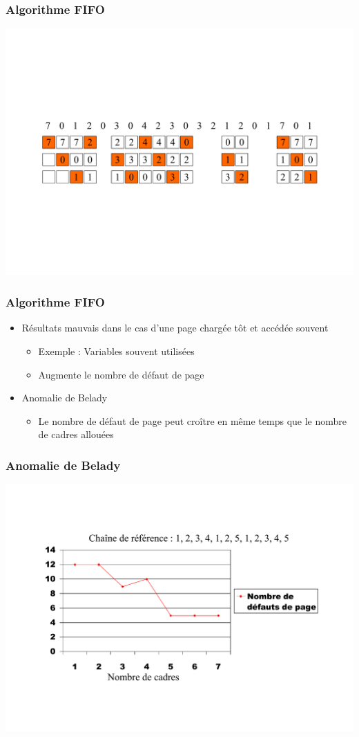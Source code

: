\begin{frame}
\frametitle{Algorithme FIFO}
\includegraphics[width=\textwidth]{../illustration/remplacement_fifo.pdf}
\end{frame}


\begin{frame}
\frametitle{Algorithme FIFO}
\begin{itemize}
\item Résultats mauvais dans le cas d'une page chargée tôt et accédée souvent
\begin{itemize}
\item Exemple : Variables souvent utilisées
\item Augmente le nombre de défaut de page
\end{itemize}
\item Anomalie de Belady
\begin{itemize}
\item Le nombre de défaut de page peut croître en même temps que le nombre de cadres allouées
\end{itemize}
\end{itemize}
\end{frame}

\begin{frame}
\frametitle{Anomalie de Belady}
\includegraphics[width=\textwidth]{../illustration/remplacement_fifo_belady.pdf}
\end{frame}


